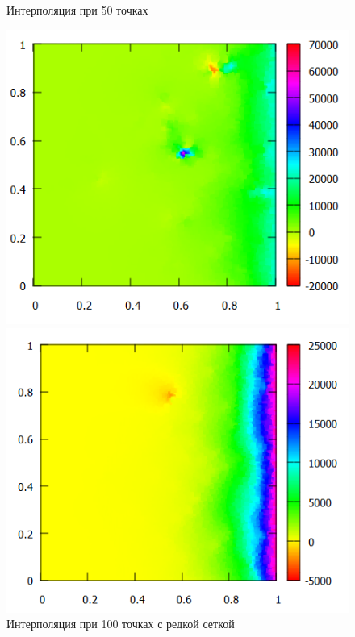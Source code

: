 \documentclass[14pt, a4paper]{extarticle}
\begin{document}
\begin{enumerate}
\begin{figure}[H]
\begin{minipage}{0.5\textwidth}
					\caption[.] {Интерполяция при 50 точках}
				\end{minipage}\hfill
			\end{figure}
			\begin{figure}[H]
				\begin{minipage}{0.5\textwidth}
					\centering
					\includegraphics[width = \linewidth]{../4func/M=100T=3718Err=0.458518.png}
					\caption[.] {Интерполяция при 100 точках с редкой сеткой}
				\end{minipage}\hfill
				\begin{minipage}{0.5\textwidth}
					\centering
					\includegraphics[width = \linewidth]{../4func/M=100T=5774Err=0.154733.png}

\end{minipage}
\end{figure}
\end{enumerate}
\end{document}

